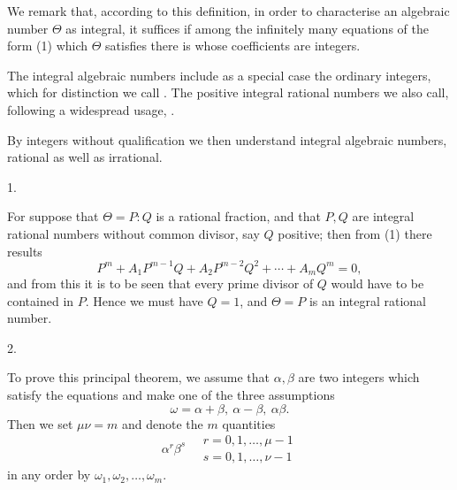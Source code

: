 
We remark that, according to this definition, in order to characterise an algebraic number $\Theta$ as integral, it suffices if among the infinitely many equations of the form (1) which $\Theta$ satisfies there is  whose coefficients are integers.

The integral algebraic numbers include as a special case the ordinary integers, which for distinction we call . The positive integral rational numbers we also call, following a widespread usage, .

By integers without qualification we then understand integral algebraic numbers, rational as well as irrational.

1. 

For suppose that $\Theta = P:Q$ is a rational fraction, and that $P, Q$ are integral rational numbers without common divisor, say $Q$ positive; then from (1) there results
\[
P^m + A_1 P^{m-1} Q + A_2 P^{m-2} Q^2 + \cdots + A_m Q^m = 0,
\]
and from this it is to be seen that every prime divisor of $Q$ would have to be contained in $P$. Hence we must have $Q = 1$, and $\Theta = P$ is an integral rational number.

2. 

To prove this principal theorem, we assume that $\alpha, \beta$ are two integers which satisfy the equations
and make one of the three assumptions
\[
\omega = \alpha + \beta, \ \alpha - \beta, \ \alpha \beta.
\]
Then we set $\mu \nu = m$ and denote the $m$ quantities
\[
\alpha^r \beta^s \quad \begin{array}{l} r = 0, 1, \ldots, \mu - 1 \\ s = 0, 1, \ldots, \nu - 1 \end{array}
\]
in any order by $\omega_1, \omega_2, \ldots, \omega_m$.
